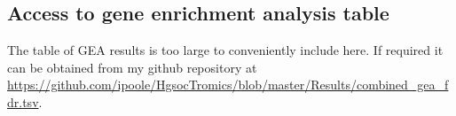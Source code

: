 \documentclass[tikz, 12pt,a4paper,oneside,fleqn]{article}
\begin{document}
\FloatBarrier

\subsection{Access to gene enrichment analysis table}
\label{tab-go-enrichment-results}

The table of GEA results is too large to conveniently include here.   If required it can be obtained from my github repository at \url{https://github.com/ipoole/HgsocTromics/blob/master/Results/combined_gea_fdr.tsv}.
\end{document}
